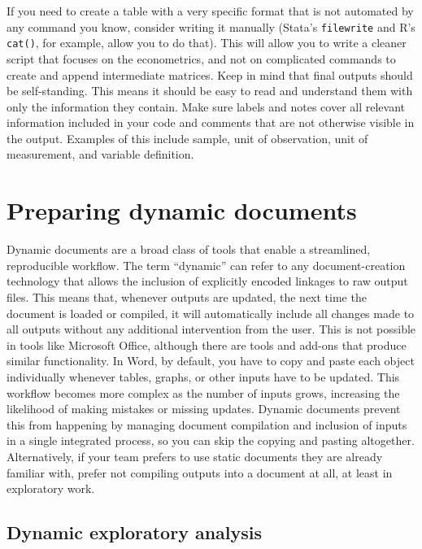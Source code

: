 If you need to create a table with a very specific format
that is not automated by any command you know, consider writing it manually
(Stata's \texttt{filewrite} and R's \texttt{cat()}, for example, allow you to do that).
This will allow you to write a cleaner script that focuses on the econometrics,
and not on complicated commands to create and append intermediate matrices.
Keep in mind that final outputs should be self-standing.
This means it should be easy to read and understand them with only the information they contain.
Make sure labels and notes cover all relevant information 
included in your code and comments that are not otherwise visible in the output.
Examples of this include sample, 
unit of observation, unit of measurement, and variable definition.

\section{Preparing dynamic documents}

Dynamic documents are a broad class of tools that enable a streamlined, reproducible workflow.
The term ``dynamic'' can refer to any document-creation technology
that allows the inclusion of explicitly encoded linkages to raw output files.
This means that, whenever outputs are updated,
the next time the document is loaded or compiled, it will automatically include
all changes made to all outputs without any additional intervention from the user.
This is not possible in tools like Microsoft Office,
although there are tools and add-ons that produce similar functionality.
In Word, by default, you have to copy and paste each object individually
whenever tables, graphs, or other inputs have to be updated.
This workflow becomes more complex as the number of inputs grows,
increasing the likelihood of making mistakes or missing updates.
Dynamic documents prevent this from happening by managing document compilation and
inclusion of inputs in a single integrated process,
so you can skip the copying and pasting altogether.
Alternatively, if your team prefers to use static documents they are already familiar with,
prefer not compiling outputs into a document at all, at least in exploratory work.

\subsection{Dynamic exploratory analysis}	

